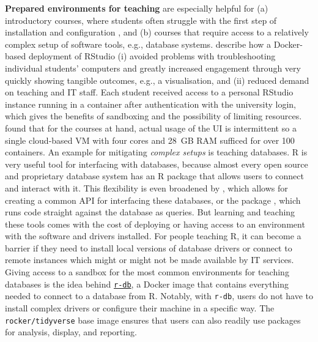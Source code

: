 \textbf{Prepared environments for teaching} are especially helpful for
(a) introductory courses, where students often struggle with the first
step of installation and configuration
\citep{cetinkaya-rundel_infrastructure_2018}, and (b) courses that
require access to a relatively complex setup of software tools, e.g.,
database systems. \citet{cetinkaya-rundel_infrastructure_2018} describe
how a Docker-based deployment of RStudio (i) avoided problems with
troubleshooting individual students' computers and greatly increased
engagement through very quickly showing tangible outcomes, e.g., a
visualisation, and (ii) reduced demand on teaching and IT staff. Each
student received access to a personal RStudio instance running in a
container after authentication with the university login, which gives
the benefits of sandboxing and the possibility of limiting resources.
\citet{cetinkaya-rundel_infrastructure_2018} found that for the courses
at hand, actual usage of the UI is intermittent so a single cloud-based
VM with four cores and 28~GB RAM sufficed for over 100 containers. An
example for mitigating \emph{complex setups} is teaching databases. R is
very useful tool for interfacing with databases, because almost every
open source and proprietary database system has an R package that allows
users to connect and interact with it. This flexibility is even
broadened by  \citep{cran_dbi}, which allows for creating a
common API for interfacing these databases, or the 
package \citep{cran_dbplyr}, which runs 
\citep{cran_dplyr} code straight against the database as queries. But
learning and teaching these tools comes with the cost of deploying or
having access to an environment with the software and drivers installed.
For people teaching R, it can become a barrier if they need to install
local versions of database drivers or connect to remote instances which
might or might not be made available by IT services. Giving access to a
sandbox for the most common environments for teaching databases is the
idea behind \href{https://github.com/ColinFay/r-db}{\texttt{r-db}}, a
Docker image that contains everything needed to connect to a database
from R. Notably, with \texttt{r-db}, users do not have to install
complex drivers or configure their machine in a specific way. The
\texttt{rocker/tidyverse} base image ensures that users can also readily
use packages for analysis, display, and reporting.

